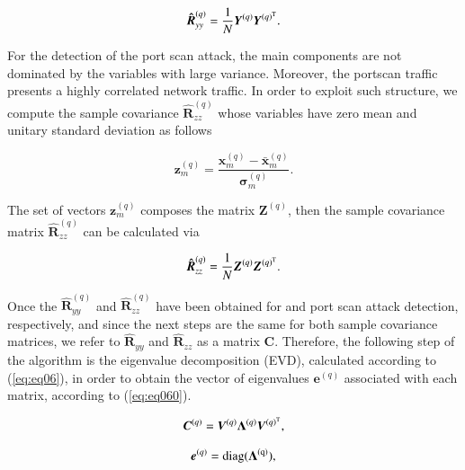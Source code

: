 \documentclass[review]{elsarticle}
\providecommand{\DIFaddtex}[1]{{\protect\color{blue}\uwave{#1}}} %
\providecommand{\DIFaddbegin}{} %
\providecommand{\DIFaddend}{} %
\providecommand{\DIFadd}[1]{\texorpdfstring{\DIFaddtex{#1}}{#1}} %
\begin{document}
\begin{equation}\label{eq:eq03}
\boldsymbol{\hat{R}}_{yy}^{(q)} = \frac{1}{N}\boldsymbol{Y}^{(q)}\boldsymbol{Y}^{(q)^{\rm T}}.
\end{equation}

For the detection of the port scan attack, the main components are not dominated by the variables with large variance. Moreover, the portscan traffic presents a highly correlated network traffic. In order to exploit such structure, we compute the sample covariance $\boldsymbol{\hat{R}}_{zz}^{(q)}$ whose variables have zero mean and unitary standard deviation as follows

\begin{equation}\label{eq:eq04}
\boldsymbol{z}_{m}^{(q)} = \frac{\boldsymbol{x}_{m}^{(q)} - \bar{\boldsymbol{x}}_{m}^{(q)}}{\boldsymbol{\sigma}_{m}^{(q)}}.
\end{equation}

The set of vectors $\boldsymbol{z}_{m}^{(q)}$ composes the matrix $\boldsymbol{Z}^{(q)}$, then the sample covariance matrix $\boldsymbol{\hat{R}}_{zz}^{(q)}$ can be calculated via 

\begin{equation}\label{eq:eq05}
\boldsymbol{\hat{R}}_{zz}^{(q)} = \frac{1}{N}\boldsymbol{Z}^{(q)}\boldsymbol{Z}^{(q)^{\rm T}}.
\end{equation}

Once the $\boldsymbol{\hat{R}}_{yy}^{(q)}$ and $\boldsymbol{\hat{R}}_{zz}^{(q)}$ have been obtained for \DIFaddbegin \DIFadd{flood }\DIFaddend and port scan attack detection, respectively, and since the next steps are the same for both sample covariance matrices, we refer to $\boldsymbol{\hat{R}}_{yy}$ and $\boldsymbol{\hat{R}}_{zz}$ as a matrix $\boldsymbol{C}$. Therefore, the following step of the algorithm is the eigenvalue decomposition (EVD), calculated according to (\ref{eq:eq06}), in order to obtain the vector of eigenvalues $\boldsymbol{e}^{(q)}$ associated with each matrix, according to (\ref{eq:eq060}).

\begin{equation}\label{eq:eq06}
\boldsymbol{C}^{(q)} = \boldsymbol{V}^{(q)}\boldsymbol{\Lambda}^{(q)}\boldsymbol{V}^{(q)^{\rm T}},
\end{equation}

\begin{equation}\label{eq:eq060}
\boldsymbol{e}^{(q)} = \rm diag(\boldsymbol{\Lambda}^{(q)}),
\end{equation}
\end{document}
